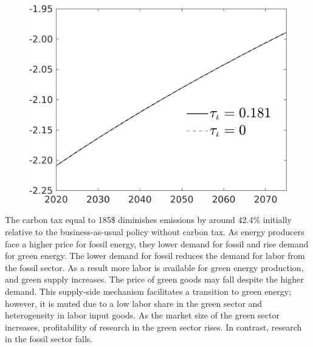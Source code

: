 \begin{figure}[h!!]
\begin{minipage}[]{0.32\textwidth}
\end{minipage}
\begin{minipage}[]{0.32\textwidth}
\includegraphics[width=1\textwidth]{../../codding_model/own_basedOnFried/optimalPol_010922_revision/figures/all_13Sept22/PerdifNoTauf_regime0_CompTaul_EY_spillover0_nsk0_xgr0_knspil0_sep0_LFlimit0_emsbase0_countec0_GovRev0_etaa0.79_lgd1.png}
\end{minipage}

\end{figure} 
 The carbon tax equal to 185\$ diminishes emissions by around 42.4\% initially relative to the business-as-usual policy without carbon tax. As energy producers face a higher price for fossil energy, they lower demand for fossil and rise demand for green energy. The lower demand for fossil reduces the demand for labor from the fossil sector. As a result more labor is available for green energy production, and green supply increases. The price of green goods may fall despite the higher demand. This supply-side mechanism facilitates a transition to green energy; however, it is muted due to a low labor share in the green sector and heterogeneity in labor input goods.
 As the market size of the green sector increases, profitability of research in the green sector rises. In contrast, research in the fossil sector falls. 
 
